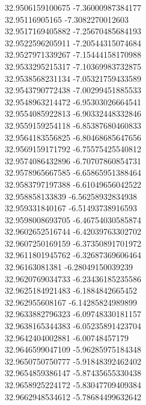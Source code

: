 {32.9506159100675	-7.36000987384177\\
32.95116905165	-7.3082270012603\\
32.9517169405882	-7.25670485684193\\
32.9522596205911	-7.20544315074684\\
32.9527971339267	-7.15444158170988\\
32.9533295215317	-7.10369983732875\\
32.9538568231134	-7.05321759433589\\
32.9543790772438	-7.00299451885533\\
32.9548963214472	-6.95303026664541\\
32.9554085922813	-6.90332448332846\\
32.9559159254118	-6.85387680460833\\
32.9564183556825	-6.80468685647656\\
32.9569159171792	-6.75575425540812\\
32.9574086432896	-6.70707860854731\\
32.9578965667585	-6.65865951388464\\
32.9583797197388	-6.61049656042522\\
32.958858133839	-6.56258932834938\\
32.959331840167	-6.51493738916593\\
32.9598008693705	-6.46754030585874\\
32.9602652516744	-6.42039763302702\\
32.9607250169159	-6.37350891701972\\
32.9611801945762	-6.32687369606464\\
32.96163081381	-6.28049150039239\\
32.9620769034733	-6.23436185235586\\
32.9625184921483	-6.1884842665452\\
32.962955608167	-6.14285824989899\\
32.9633882796323	-6.09748330181157\\
32.9638165344383	-6.05235891423704\\
32.9642404002881	-6.00748457179\\
32.9646599047109	-5.96285975184348\\
32.9650750750777	-5.91848392462402\\
32.9654859386147	-5.87435655330438\\
32.9658925224172	-5.83047709409384\\
32.9662948534612	-5.78684499632642\\
}
